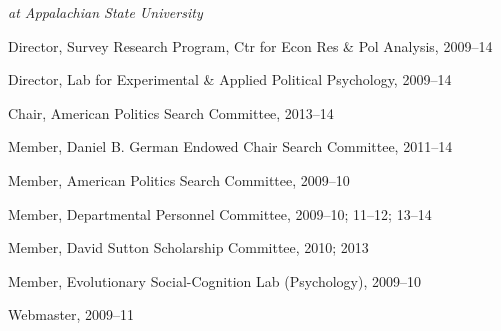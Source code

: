\documentclass[12pt]{article}
\newcommand{\halfblankline}{\quad\vspace{-0.5\baselineskip}\pagebreak[3]}
\begin{document}
\halfblankline
        
    \emph{at Appalachian State University}
        \begin{innerlist}
        \item[] Director, Survey Research Program, Ctr for Econ Res \& Pol Analysis, 2009--14
        \item[] Director, Lab for Experimental \& Applied Political Psychology, 2009--14
        \item[] Chair, American Politics Search Committee, 2013--14
        \item[] Member, Daniel B. German Endowed Chair Search Committee, 2011--14  
        \item[] Member, American Politics Search Committee, 2009--10
        \item[] Member, Departmental Personnel Committee, 2009--10; 11--12; 13--14
        \item[] Member, David Sutton Scholarship Committee, 2010; 2013
        \item[] Member, Evolutionary Social-Cognition Lab (Psychology), 2009--10
        \item[] Webmaster, 2009--11
        \end{innerlist}
\end{document}
